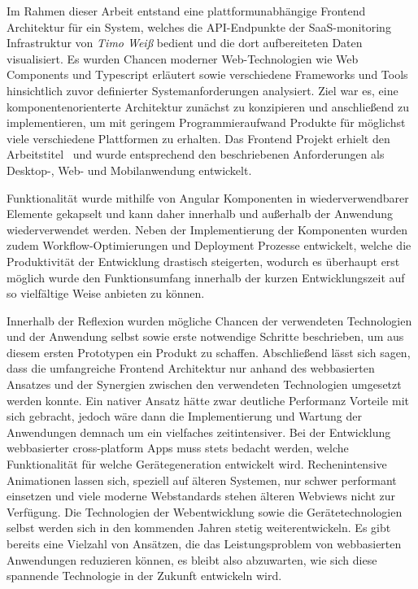 Im Rahmen dieser Arbeit entstand eine plattformunabhängige Frontend Architektur für ein System,
welches die API-Endpunkte der SaaS-monitoring Infrastruktur von \emph{Timo Weiß} bedient und die dort aufbereiteten Daten visualisiert.
Es wurden Chancen moderner Web-Technologien wie Web Components und Typescript erläutert
sowie verschiedene Frameworks und Tools hinsichtlich zuvor definierter Systemanforderungen analysiert.
Ziel war es, eine komponentenorienterte Architektur zunächst zu konzipieren und anschließend zu implementieren, um
mit geringem Programmieraufwand Produkte für möglichst viele verschiedene Plattformen zu erhalten.
Das Frontend Projekt erhielt den Arbeitstitel \projectname{} und wurde entsprechend den beschriebenen Anforderungen
als Desktop-, Web- und Mobilanwendung entwickelt.

Funktionalität wurde mithilfe von Angular Komponenten in wiederverwendbarer
Elemente gekapselt und kann daher innerhalb und außerhalb der Anwendung wiederverwendet werden.
Neben der Implementierung der Komponenten wurden zudem Workflow-Optimierungen und Deployment Prozesse entwickelt,
welche die Produktivität der Entwicklung drastisch steigerten, wodurch es überhaupt erst möglich wurde den Funktionsumfang
innerhalb der kurzen Entwicklungszeit auf so vielfältige Weise anbieten zu können.

Innerhalb der Reflexion wurden mögliche Chancen der verwendeten Technologien und der Anwendung selbst
sowie erste notwendige Schritte beschrieben, um aus diesem ersten
Prototypen ein Produkt zu schaffen.
Abschließend lässt sich sagen, dass die umfangreiche Frontend Architektur nur anhand des webbasierten Ansatzes und der Synergien zwischen den verwendeten Technologien umgesetzt werden konnte.
Ein nativer Ansatz hätte zwar deutliche Performanz Vorteile mit sich gebracht, jedoch wäre dann die Implementierung und Wartung der Anwendungen demnach um ein vielfaches zeitintensiver.
Bei der Entwicklung webbasierter cross-platform Apps muss stets bedacht werden, welche Funktionalität für welche Gerätegeneration entwickelt wird.
Rechenintensive Animationen lassen sich, speziell auf älteren Systemen, nur schwer performant einsetzen und viele moderne Webstandards stehen älteren Webviews nicht zur Verfügung.
Die Technologien der Webentwicklung sowie die Gerätetechnologien selbst werden sich in den kommenden Jahren stetig weiterentwickeln. Es gibt bereits eine Vielzahl von Ansätzen, die das Leistungsproblem von webbasierten Anwendungen reduzieren können,
es bleibt also abzuwarten, wie sich diese spannende Technologie in der Zukunft entwickeln wird.
